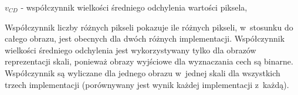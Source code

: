 $ v_{CD} $ - współczynnik wielkości średniego odchylenia wartości piksela,

Współczynnik liczby różnych pikseli pokazuje ile różnych pikseli, w~stosunku do całego obrazu, jest obecnych dla dwóch różnych implementacji. Współczynnik wielkości średniego odchylenia jest wykorzystywany tylko dla obrazów reprezentacji skali, ponieważ obrazy wyjściowe dla wyznaczania cech są binarne. Współczynnik są wyliczane dla jednego obrazu w~jednej skali dla wszystkich trzech implementacji (porównywany jest wynik każdej implementacji z~każdą).
